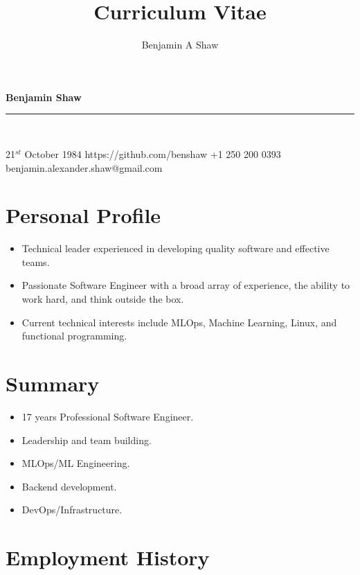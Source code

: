 \documentclass{article}
\title{Curriculum Vitae}
\author{Benjamin A Shaw}
\begin{document}
{\huge{\color{slateblue}\textbf{Benjamin Shaw}}}\\
\rule{\textwidth}{0.5mm}\\

\begin{personaldetails}
{21$^{st}$ October 1984}
{https://github.com/benshaw}
{+1 250 200 0393}
{benjamin.alexander.shaw@gmail.com}
\end{personaldetails}


\section*{Personal Profile}
\begin{itemize}
  \item Technical leader experienced in developing quality software and effective teams.
  \item Passionate Software Engineer with a broad array of experience, the ability to work hard, and think outside the box.
  \item Current technical interests include MLOps, Machine Learning, Linux, and functional programming.
\end{itemize}

\section*{Summary}
\begin{itemize}
  \item 17 years Professional Software Engineer.
  \item Leadership and team building.
  \item MLOps/ML Engineering.
  \item Backend development.
  \item DevOps/Infrastructure.
\end{itemize}

\section*{Employment History}
\end{document}
